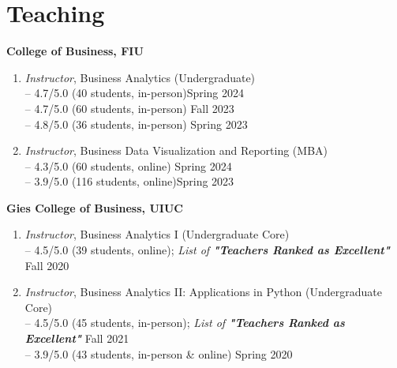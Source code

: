 \documentclass[margin,line]{resume}
\begin{document}
\begin{resume}
\begin{enumerate}[topsep=0pt, leftmargin=*]
	  \end{enumerate}
	  

	  
 	  \section{\mysidestyle Teaching} 
 	  \textbf{College of Business, FIU}
 	    \begin{enumerate}[topsep=1pt, leftmargin=*]
         \item {\sl Instructor}, Business Analytics (Undergraduate)\\
         -- 4.7/5.0 (40 students, in-person)\hfill Spring 2024\\
         -- 4.7/5.0 (60 students, in-person) \hfill Fall 2023\\
         -- 4.8/5.0 (36 students, in-person) \hfill Spring 2023
         \item {\sl Instructor}, Business Data Visualization and Reporting (MBA)\\
         -- 4.3/5.0 (60 students, online) \hfill Spring 2024\\
         -- 3.9/5.0 (116 students, online)\hfill Spring 2023
         \end{enumerate}
 	  
         \textbf{Gies College of Business, UIUC}
         \begin{enumerate}[topsep=1pt, leftmargin=*]
         \item {\sl Instructor}, Business Analytics I (Undergraduate Core)\\ [0.3em]
         -- 4.5/5.0 (39 students, online); \textit{List of \textbf{"Teachers Ranked as Excellent"} } \hfill Fall 2020
         \item {\sl Instructor}, Business Analytics II: Applications in Python (Undergraduate Core)\\[0.3em]
         -- 4.5/5.0 (45 students, in-person); \textit{List of \textbf{"Teachers Ranked as Excellent"} } \hfill Fall 2021\\
         -- 3.9/5.0 (43 students, in-person \& online)  \hfill Spring 2020
         \end{enumerate}


\end{resume}
\end{document}
